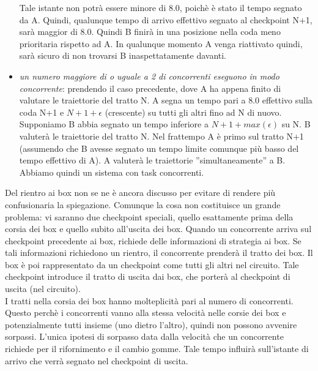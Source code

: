 \begin{itemize}
Tale istante non potr\`{a} essere minore di 8.0, poich\`{e} \`{e} stato il tempo segnato da A. Quindi, qualunque tempo di arrivo effettivo segnato al checkpoint
N+1, sar\`{a} maggior di 8.0. Quindi B finir\`{a} in una posizione nella coda meno prioritaria rispetto ad A. In qualunque momento A venga riattivato quindi, sar\`{a}
sicuro di non trovarsi B inaspettatamente davanti.
\item \emph{un numero maggiore di o uguale a 2 di concorrenti eseguono in modo concorrente}: prendendo il caso precedente, dove A ha appena finito di valutare le
traiettorie del tratto N. A segna un tempo pari a 8.0 effettivo sulla coda N+1 e $N+1+\epsilon$ (crescente) su tutti gli altri fino ad N di nuovo. Supponiamo
B abbia segnato un tempo inferiore a $N+1+max(\epsilon)$ su N. B valuter\`{a} le traiettorie del tratto N. Nel frattempo A \`{e} primo sul tratto N+1 (assumendo
che B avesse segnato un tempo limite comunque pi\`{u} basso del tempo effettivo di A). A valuter\`{a} le traiettorie
''simultaneamente'' a B. Abbiamo quindi un sistema con task concorrenti.
\end{itemize}
Del rientro ai box non se ne \`{e} ancora discusso per evitare di rendere pi\`{u} confusionaria la spiegazione. Comunque la cosa non costituisce
un grande problema: vi saranno due checkpoint speciali, quello esattamente prima della corsia dei box e quello subito all'uscita dei box.
Quando un concorrente arriva sul checkpoint precedente ai box, richiede delle informazioni di strategia ai box. Se tali informazioni
richiedono un rientro, il concorrente prender\`{a} il tratto dei box. Il box \`{e} poi rappresentato da un checkpoint come tutti gli altri nel circuito.
Tale checkpoint introduce il tratto di uscita dai box, che porter\`{a} al checkpoint di uscita (nel circuito).\\
I tratti nella corsia dei box hanno molteplicit\`{a} pari al numero di concorrenti. Questo perch\`{e} i concorrenti vanno alla stessa
velocit\`{a} nelle corsie dei box e potenzialmente tutti insieme (uno dietro l'altro), quindi non possono avvenire sorpassi. L'unica ipotesi di
sorpasso data dalla velocit\`{a} che un concorrente richiede per il rifornimento e il cambio gomme. Tale tempo influir\`{a} sull'istante di arrivo
che verr\`{a} segnato nel checkpoint di uscita.
